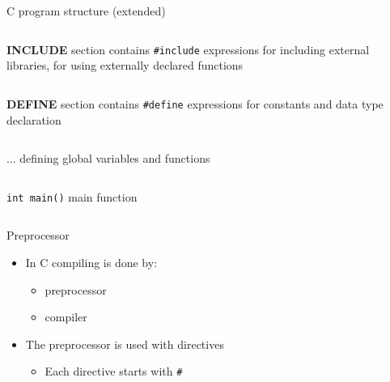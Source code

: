 \begin{frame}{C program structure (extended)}
    \begin{columns}
        \textbf{INCLUDE} section
         contains \texttt{\#include} expressions for
        including external libraries, for using externally declared functions
    \end{columns}
    \hfill
    \linebreak
    \begin{columns}
        \textbf{DEFINE} section
         contains \texttt{\#define} expressions for constants and
        data type declaration
    \end{columns}   
    \hfill
    \linebreak
    \begin{columns}
        ...
         defining global variables and functions
    \end{columns}
    \hfill
    \linebreak
    \begin{columns}
        \texttt{int main()}
         main function
    \end{columns}
\end{frame}

\begin{frame}{Preprocessor}
\begin{itemize}
    \item In C compiling is done by:
    \begin{itemize}
        \item preprocessor
        \item compiler
    \end{itemize}
    \item The preprocessor is used with directives
    \begin{itemize}
        \item Each directive starts with \texttt{\#}
    \end{itemize}
\end{itemize}
\end{frame}

